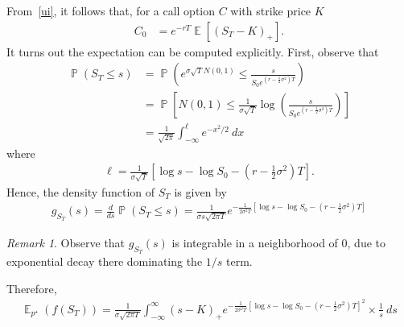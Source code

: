 \documentclass[12pt]{article}
\DeclareMathOperator{\ex}{\mathbb{E}}
\DeclareMathOperator{\prob}{\mathbb{P}}
\theoremstyle{plain}
\theoremstyle{definition}
\theoremstyle{remark}
\newtheorem*{remark}{Remark}
\numberwithin{equation}{section}  %
\begin{document}
From~\eqref{ui}, it follows that, for a call option $C$ with strike
price $K$
\begin{equation*}
	\begin{split}
		C_{0} & =  e^{-rT} \ex \left [{\left( S_{T} - K \right)}_{+} \right ].
	\end{split}
\end{equation*}
It turns out the expectation can be computed explicitly.
First, observe that
\begin{equation*}
\begin{split}
	\prob(S_{T} \le s)
	& = \prob(e^{\sigma \sqrt{T}N(0,1)} \le
	\frac{s}{S_{0}e^{(r- \frac{1}{2} \sigma^{2})T}})
	\\
	& = \prob \left [N(0,1) \le \frac{1}{\sigma \sqrt{T}} \log\left(
	\frac{s}{S_{0} e^{(r - \frac{1}{2}\sigma^{2})T}} \right) \right ]
	\\
	& = \frac{1}{\sqrt{2 \pi}}  \int_{-\infty}^{ \ell}
	e^{- x^{2}/2} \ dx
\end{split}
\end{equation*}
where
\begin{equation*}
\begin{split}
\ell = \frac{1}{\sigma \sqrt{T}}
	\left [ \log s - \log S_{0} - (r - \frac{1}{2} \sigma^{2})T \right ].
\end{split}
\end{equation*}
Hence, the density function of $S_{T}$ is given by
\begin{equation*}
\begin{split}
	g_{S_{T}}(s) = \frac{d}{ds} \prob (S_{T} \le s)
	= \frac{1}{\sigma s \sqrt{2 \pi T}}
	e^{- \frac{1}{2 \sigma^{2} T} \left[ \log s - \log S_{0} - (r - \frac{1}{2}
	\sigma^{2})T \right]}
\end{split}
\end{equation*}
\begin{framed}
\begin{remark}
Observe that $g_{S_{T}}(s)$ is integrable in a neighborhood of $0$, due
to exponential decay there dominating the $1/s$ term. 
\end{remark}
\end{framed}
Therefore,
\begin{equation*}
\begin{split}
	\ex_{p^{\star}}(f(S_{T})) = 
	\frac{1}{\sigma \sqrt{2 \pi T}} \int_{-\infty}^{\infty}{(s- K)}_{+}
	e^{- \frac{1}{2 \sigma^{2} T} \left[ \log s - \log S_{0} - (r - \frac{1}{2}
	\sigma^{2})T \right]^{2}} \times \frac{1}{s}  \ ds
\end{split}
\end{equation*}
\end{document}
